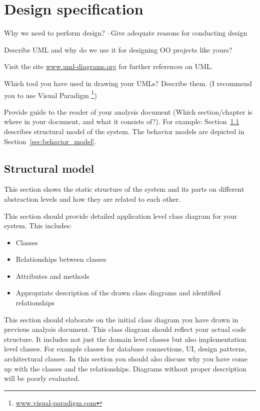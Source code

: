 \chapter{Design specification} %
\label{cha:design}

Why we need to perform design? --Give adequate reasons for conducting design

Describe UML and why do we use it for designing OO projects like yours?

Visit the site \url{www.uml-diagrams.org} for further references on UML.

Which tool you have used in drawing your UMLs? Describe them. (I recommend you to use Visual Paradigm \footnote{\url{www.visual-paradigm.com}})

Provide guide to the reader of your analysis document (Which section/chapter is where in your document, and what it consists of?). For example: Section~\ref{sec:structural_model} describes structural model of the system. The behavior models are depicted in Section~\ref{sec:behavior_model}.

\section{Structural model} %
\label{sec:structural_model}
This section shows the static structure of the system and its parts on different abstraction levels and how they are related to each other. 

This section should provide detailed application level class diagram for your system. This includes:

\begin{itemize}
  \item Classes
  \item Relationships between classes
  \item Attributes and methods
  \item Appropriate description of the drawn class diagrams and identified relationships
\end{itemize}

This section should elaborate on the initial class diagram you have drawn in previous analysis document. This class diagram should reflect your actual code structure. It includes not just the domain level classes but also implementation level classes. For example classes for database connections, UI, design patterns, architectural classes. In this section you should also discuss why you have come up with the classes and the relationships. Diagrams without proper description will be poorly evaluated.

